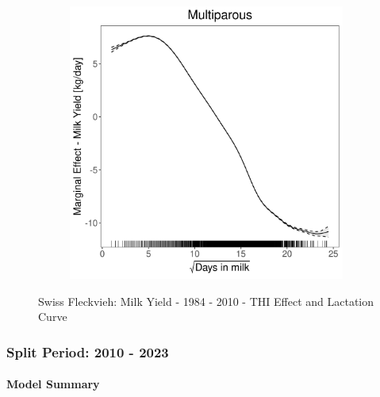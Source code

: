 \begin{figure}[H]
\begin{subfigure}[b]{0.45\textwidth}
    \end{subfigure}
    \hspace{0.05\textwidth} %
    \begin{subfigure}[b]{0.45\textwidth}
        \centering
        \includegraphics[width=\textwidth]{thesis/figures/models/milk/before2010/sf_milk_before2010/sf_milk_before2010_marginal_dim_milk_multi.png}
    \end{subfigure}
    \caption[]{Swiss Fleckvieh: Milk Yield - 1984 - 2010 - THI Effect and Lactation Curve}
    \label{fig:main}
\end{figure}

\subsubsection{Split Period: 2010 - 2023}\label{model:sf_milk_after}

\paragraph{Model Summary} \quad \\

